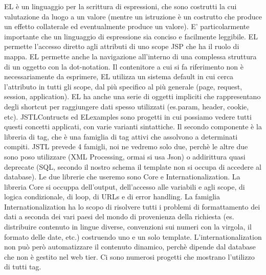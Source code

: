 EL è un linguaggio per la scrittura di espressioni, che sono costrutti la cui valutazione da luogo a un valore (mentre un istruzione è un costrutto che produce un effetto collaterale ed eventualmente produce un valore).\newline
E' particolarmente importante che un linguaggio di espressione sia conciso e facilmente leggibile. EL permette l'accesso diretto agli attributi di uno scope JSP che ha il ruolo di mappa. EL permette anche la navigazione all'interno di una complessa struttura di un oggetto con la dot-notation.\newline
Il contenitore a cui si fa riferimento non è necessariamente da esprimere, EL utilizza un sistema default in cui cerca l'attributo in tutti gli scope, dal più specifico al più generale (page, request, session, application).\newline
EL ha anche una serie di oggetti impliciti che rappresentano degli shortcut per raggiungere dati spesso utilizzati (es.param, header, cookie, etc).\newline
\newline
JSTLContructs ed ELexamples sono progetti in cui possiamo vedere tutti questi concetti applicati, con varie varianti sintattiche.\newline
\newline
Il secondo componente è la libreria di tag, che è una famiglia di tag attivi che assolvono a determinati compiti. JSTL prevede 4 famigli, noi ne vedremo solo due, perchè le altre due sono poso utilizzare (XML Processing, ormai si usa Json) o addirittura quasi deprecate (SQL, secondo il nostro schema il template non si occupa di accedere al database). Le due librerie che useremo sono Core e Internationalization.\newline
La libreria Core si occuppa dell'output, dell'accesso alle variabili e agli scope, di logica condizionale, di loop, di URLs e di error handling.\newline
La famiglia Internationalization ha lo scopo di risolvere tutti i problemi di formattamento dei dati a seconda dei vari paesi del mondo di provenienza della richiesta (es. distribuire contenuto in lingue diverse, convenzioni sui numeri con la virgola, il formato delle date, etc.) costruendo uno e un solo template. L'internationalization non può però automatizzare il contenuto dinamico, perchè dipende dal database che non è gestito nel web tier.\newline
\newline
Ci sono numerosi progetti che mostrano l'utilizzo di tutti tag.\newline
\newline
